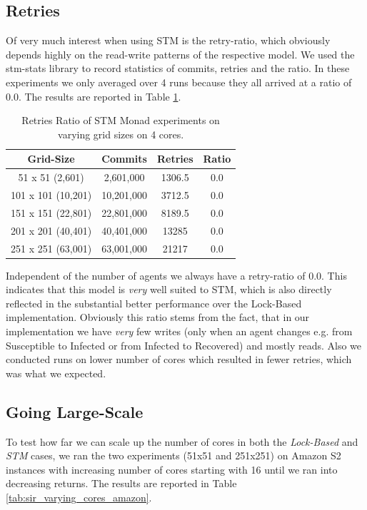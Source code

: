\subsection{Retries}
Of very much interest when using STM is the retry-ratio, which obviously depends highly on the read-write patterns of the respective model. We used the stm-stats library to record statistics of commits, retries and the ratio. In these experiments we only averaged over 4 runs because they all arrived at a ratio of 0.0. The results are reported in Table \ref{tab:retries_stm}.

\begin{table}
	\centering
  	\begin{tabular}{ c || c | c | c }
        Grid-Size 		   & Commits    & Retries & Ratio \\ \hline \hline 
   		51 x 51 (2,601)    & 2,601,000  & 1306.5  & 0.0 \\ \hline
   		101 x 101 (10,201) & 10,201,000 & 3712.5  & 0.0 \\ \hline
   		151 x 151 (22,801) & 22,801,000 & 8189.5  & 0.0 \\ \hline
   		201 x 201 (40,401) & 40,401,000 & 13285   & 0.0 \\ \hline 
   		251 x 251 (63,001) & 63,001,000 & 21217   & 0.0 \\ \hline \hline
  	\end{tabular}
  	
  	\caption{Retries Ratio of STM Monad experiments on varying grid sizes on 4 cores.}
	\label{tab:retries_stm}
\end{table}

Independent of the number of agents we always have a retry-ratio of 0.0. This indicates that this model is \textit{very} well suited to STM, which is also directly reflected in the substantial better performance over the Lock-Based implementation. Obviously this ratio stems from the fact, that in our implementation we have \textit{very} few writes (only when an agent changes e.g. from Susceptible to Infected or from Infected to Recovered) and mostly reads. Also we conducted runs on lower number of cores which resulted in fewer retries, which was what we expected.

\subsection{Going Large-Scale}
To test how far we can scale up the number of cores in both the \textit{Lock-Based} and \textit{STM} cases, we ran the two experiments (51x51 and 251x251) on Amazon S2 instances with increasing number of cores starting with 16 until we ran into decreasing returns. The results are reported in Table \ref{tab:sir_varying_cores_amazon}.

